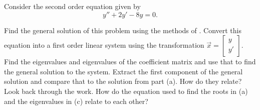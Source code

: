\documentclass{ximera}
\begin{document}

\begin{exercise}
    Consider the second order equation given by
    \begin{equation*}
        y'' + 2y' - 8y = 0.
    \end{equation*}
    \begin{tasks}
        \task Find the general solution of this problem using the methods of .
        \task Convert this equation into a first order linear system using the transformation $\vec{x} = \left[ \begin{smallmatrix} y \\ y' \end{smallmatrix} \right]$. 
        \task Find the eigenvalues and eigenvalues of the coefficient matrix and use that to find the general solution to the system.
        \task Extract the first component of the general solution and compare that to the solution from part (a). How do they relate?
        \task Look back through the work. How do the equation used to find the roots in (a) and the eigenvalues in (c) relate to each other?
    \end{tasks}
\end{exercise}
\end{document}
